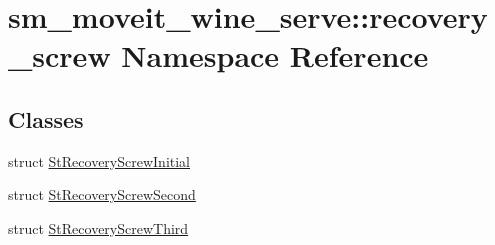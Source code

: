 \hypertarget{namespacesm__moveit__wine__serve_1_1recovery__screw}{}\section{sm\+\_\+moveit\+\_\+wine\+\_\+serve\+:\+:recovery\+\_\+screw Namespace Reference}
\label{namespacesm__moveit__wine__serve_1_1recovery__screw}
\subsection*{Classes}
\begin{DoxyCompactItemize}
\item 
struct \hyperlink{structsm__moveit__wine__serve_1_1recovery__screw_1_1StRecoveryScrewInitial}{St\+Recovery\+Screw\+Initial}
\item 
struct \hyperlink{structsm__moveit__wine__serve_1_1recovery__screw_1_1StRecoveryScrewSecond}{St\+Recovery\+Screw\+Second}
\item 
struct \hyperlink{structsm__moveit__wine__serve_1_1recovery__screw_1_1StRecoveryScrewThird}{St\+Recovery\+Screw\+Third}
\end{DoxyCompactItemize}
